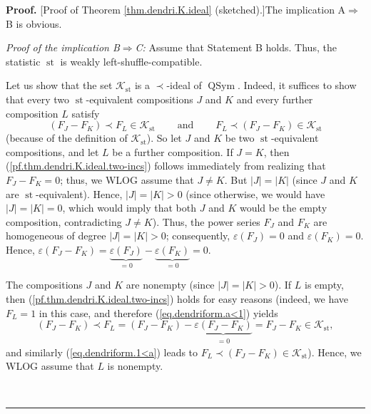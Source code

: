 \documentclass[numbers=enddot,12pt,final,onecolumn,notitlepage]{scrartcl}%
\theoremstyle{definition}
\newenvironment{proof}[1][Proof]{\noindent\textbf{#1.} }{\ \rule{0.5em}{0.5em}}
\begin{document}
\begin{proof}
[Proof of Theorem \ref{thm.dendri.K.ideal} (sketched).]The implication
A$\Longrightarrow$B is obvious.

\textit{Proof of the implication B}$\Longrightarrow$\textit{C:} Assume that
Statement B holds. Thus, the statistic $\operatorname*{st}$ is weakly left-shuffle-compatible.

Let us show that the set $\mathcal{K}_{\operatorname*{st}}$ is a $\left.
\prec\right.  $-ideal of $\operatorname*{QSym}$. Indeed, it suffices to show
that every two $\operatorname*{st}$-equivalent compositions $J$ and $K$ and
every further composition $L$ satisfy%
\begin{equation}
\left(  F_{J}-F_{K}\right)  \left.  \prec\right.  F_{L}\in\mathcal{K}%
_{\operatorname*{st}}\ \ \ \ \ \ \ \ \ \ \text{and}\ \ \ \ \ \ \ \ \ \ F_{L}%
\left.  \prec\right.  \left(  F_{J}-F_{K}\right)  \in\mathcal{K}%
_{\operatorname*{st}} \label{pf.thm.dendri.K.ideal.two-incs}%
\end{equation}
(because of the definition of $\mathcal{K}_{\operatorname*{st}}$). So let $J$
and $K$ be two $\operatorname*{st}$-equivalent compositions, and let $L$ be a
further composition. If $J=K$, then (\ref{pf.thm.dendri.K.ideal.two-incs})
follows immediately from realizing that $F_{J}-F_{K}=0$; thus, we WLOG assume
that $J\neq K$. But $\left\vert J\right\vert =\left\vert K\right\vert $ (since
$J$ and $K$ are $\operatorname*{st}$-equivalent). Hence, $\left\vert
J\right\vert =\left\vert K\right\vert >0$ (since otherwise, we would have
$\left\vert J\right\vert =\left\vert K\right\vert =0$, which would imply that
both $J$ and $K$ would be the empty composition, contradicting $J\neq K$).
Thus, the power series $F_{J}$ and $F_{K}$ are homogeneous of degree
$\left\vert J\right\vert =\left\vert K\right\vert >0$; consequently,
$\varepsilon\left(  F_{J}\right)  =0$ and $\varepsilon\left(  F_{K}\right)
=0$. Hence, $\varepsilon\left(  F_{J}-F_{K}\right)  =\underbrace{\varepsilon
\left(  F_{J}\right)  }_{=0}-\underbrace{\varepsilon\left(  F_{K}\right)
}_{=0}=0$.

The compositions $J$ and $K$ are nonempty (since $\left\vert J\right\vert
=\left\vert K\right\vert >0$). If $L$ is empty, then
(\ref{pf.thm.dendri.K.ideal.two-incs}) holds for easy reasons (indeed, we have
$F_{L}=1$ in this case, and therefore (\ref{eq.dendriform.a<1}) yields
\[
\left(  F_{J}-F_{K}\right)  \left.  \prec\right.  F_{L}=\left(  F_{J}%
-F_{K}\right)  -\underbrace{\varepsilon\left(  F_{J}-F_{K}\right)
}_{\substack{=0}}=F_{J}-F_{K}\in\mathcal{K}_{\operatorname*{st}},
\]
and similarly (\ref{eq.dendriform.1<a}) leads to $F_{L}\left.  \prec\right.
\left(  F_{J}-F_{K}\right)  \in\mathcal{K}_{\operatorname*{st}}$). Hence, we
WLOG assume that $L$ is nonempty.


\end{proof}
\end{document}

